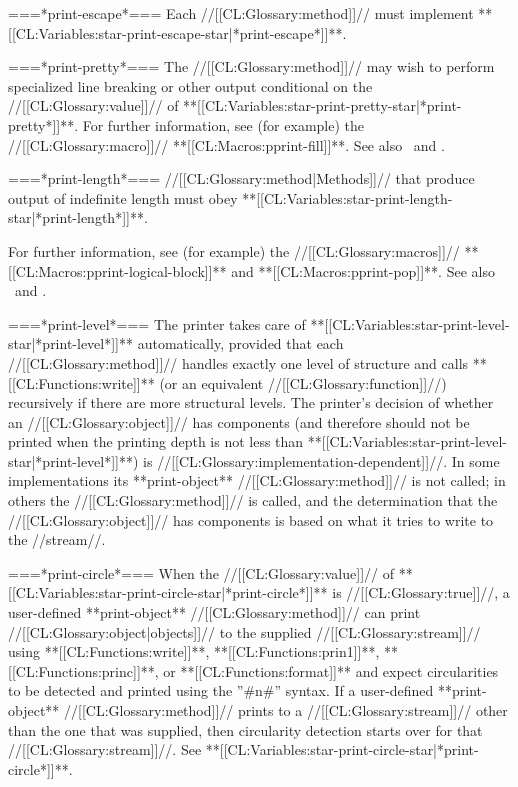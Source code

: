 ===*print-escape*===
Each //[[CL:Glossary:method]]// must implement **[[CL:Variables:star-print-escape-star|*print-escape*]]**.

===*print-pretty*===
The //[[CL:Glossary:method]]// may wish to perform specialized line breaking or other output conditional on the //[[CL:Glossary:value]]// of **[[CL:Variables:star-print-pretty-star|*print-pretty*]]**. For further information, see (for example) the //[[CL:Glossary:macro]]// **[[CL:Macros:pprint-fill]]**. See also \secref\PPrintDispatchTables\ and \secref\PrettyPrinterExamples.

===*print-length*===
//[[CL:Glossary:method|Methods]]// that produce output of indefinite length must obey **[[CL:Variables:star-print-length-star|*print-length*]]**.

For further information, see (for example) the //[[CL:Glossary:macros]]// **[[CL:Macros:pprint-logical-block]]** and **[[CL:Macros:pprint-pop]]**. See also \secref\PPrintDispatchTables\ and \secref\PrettyPrinterExamples.

===*print-level*===
The printer takes care of **[[CL:Variables:star-print-level-star|*print-level*]]** automatically, provided that each //[[CL:Glossary:method]]// handles exactly one level of structure and calls **[[CL:Functions:write]]** (or an equivalent //[[CL:Glossary:function]]//) recursively if there are more structural levels. The printer's decision of whether an //[[CL:Glossary:object]]// has components (and therefore should not be printed when the printing depth is not less than **[[CL:Variables:star-print-level-star|*print-level*]]**) is //[[CL:Glossary:implementation-dependent]]//. In some implementations its **print-object** //[[CL:Glossary:method]]// is not called; in others the //[[CL:Glossary:method]]// is called, and the determination that the //[[CL:Glossary:object]]// has components is based on what it tries to write to the //stream//.

===*print-circle*===
When the //[[CL:Glossary:value]]// of **[[CL:Variables:star-print-circle-star|*print-circle*]]** is //[[CL:Glossary:true]]//, a user-defined **print-object** //[[CL:Glossary:method]]// can print //[[CL:Glossary:object|objects]]// to the supplied //[[CL:Glossary:stream]]// using **[[CL:Functions:write]]**, **[[CL:Functions:prin1]]**, **[[CL:Functions:princ]]**, or **[[CL:Functions:format]]** and expect circularities to be detected and printed using the ''#n#'' syntax. If a user-defined **print-object** //[[CL:Glossary:method]]// prints to a //[[CL:Glossary:stream]]// other than the one that was supplied, then circularity detection starts over for that //[[CL:Glossary:stream]]//. See **[[CL:Variables:star-print-circle-star|*print-circle*]]**.

